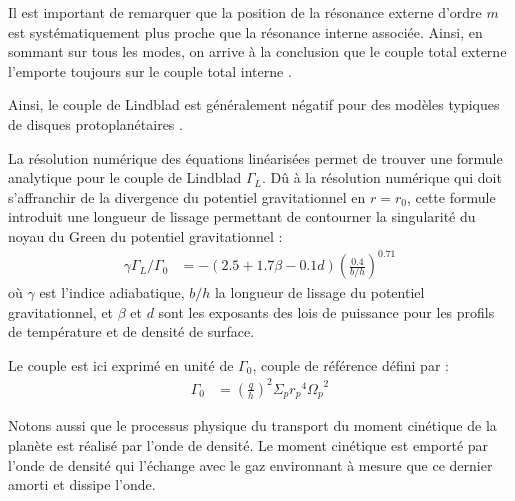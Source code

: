 \bigskip

Il est important de remarquer que la position de la résonance externe d'ordre $m$ est systématiquement plus proche que la résonance interne associée. Ainsi, en sommant sur tous les modes, on arrive à la conclusion que le couple total externe l'emporte toujours sur le couple total interne \citep{ward1997protoplanet}. 

Ainsi, le couple de Lindblad est généralement négatif pour des modèles typiques de disques protoplanétaires \citep{ward1997protoplanet}.

La résolution numérique des équations linéarisées permet de trouver une formule analytique pour le couple de Lindblad $\Gamma_L$. Dû à la résolution numérique qui doit s'affranchir de la divergence du potentiel gravitationnel en $r=r_0$, cette formule introduit une longueur de lissage permettant de contourner la singularité du noyau du Green du potentiel gravitationnel \citep[eq. (14)]{paardekooper2010torque} : 
\begin{align}
\gamma \Gamma_L/\Gamma_0 &= - \left(2.5 +1.7\beta -0.1d\right) \left(\frac{0.4}{b/h}\right)^{0.71}\label{eq:lindblad-torque}
\end{align}
où $\gamma$ est l'indice adiabatique, $b/h$ la longueur de lissage du potentiel gravitationnel, et $\beta$ et $d$ sont les exposants des lois de puissance pour les profils de température et de densité de surface. 

Le couple est ici exprimé en unité de $\Gamma_0$, couple de référence défini par : 
\begin{align}
\Gamma_0 &= \left(\frac{q}{h}\right)^2\Sigma_p {r_p}^4 {\Omega_p}^2
\end{align}

Notons aussi que le processus physique du transport du moment cinétique de la planète est réalisé par l'onde de densité. Le moment cinétique est emporté par l'onde de densité qui l'échange avec le gaz environnant à mesure que ce dernier amorti et dissipe l'onde.

